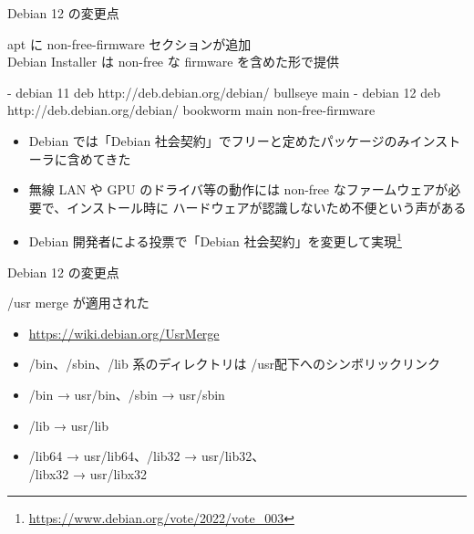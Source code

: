 
%

\begin{frame}[containsverbatim]{Debian 12 の変更点}

apt に non-free-firmware セクションが追加 \\
Debian Installer は non-free な firmware を含めた形で提供

\begin{commandlinesmall}
- debian 11
  deb http://deb.debian.org/debian/ bullseye main
- debian 12
  deb http://deb.debian.org/debian/ bookworm main non-free-firmware
\end{commandlinesmall}

\begin{itemize}
\item Debian では「Debian 社会契約」でフリーと定めたパッケージのみインストーラに含めてきた
\item 無線 LAN や GPU のドライバ等の動作には non-free なファームウェアが必要で、インストール時に ハードウェアが認識しないため不便という声がある
\item Debian 開発者による投票で「Debian 社会契約」を変更して実現\footnote{\url{https://www.debian.org/vote/2022/vote_003}}
\end{itemize}

\end{frame}


\begin{frame}{Debian 12 の変更点}%

/usr merge が適用された

\begin{itemize}
\item \url{https://wiki.debian.org/UsrMerge}
\item /bin、/sbin、/lib 系のディレクトリは /usr配下へのシンボリックリンク
\item /bin → usr/bin、/sbin → usr/sbin
\item /lib → usr/lib
\item /lib64 → usr/lib64、/lib32 → usr/lib32、\\ /libx32 → usr/libx32 
\end{itemize}

\end{frame}


